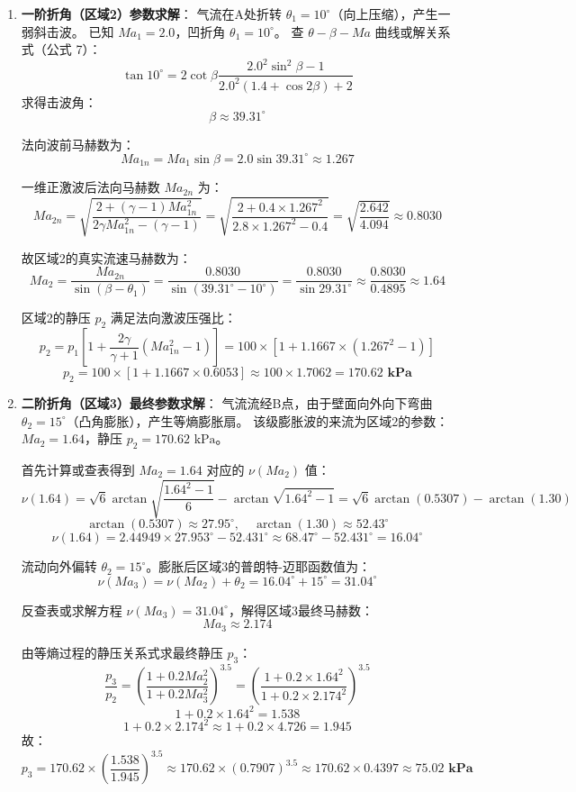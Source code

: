 \documentclass[11pt,a4paper]{ctexart}
\begin{document}
\begin{enumerate}
    \item \textbf{一阶折角（区域2）参数求解}：
    气流在A处折转 $\theta_1 = 10^\circ$（向上压缩），产生一弱斜击波。
    已知 $Ma_1 = 2.0$，凹折角 $\theta_1 = 10^\circ$。
    查 $\theta-\beta-Ma$ 曲线或解关系式（公式 7）：
    \[
    \tan 10^\circ = 2 \cot \beta \frac{2.0^2 \sin^2 \beta - 1}{2.0^2 (1.4 + \cos 2\beta) + 2}
    \]
    求得击波角：
    \[
    \beta \approx 39.31^\circ
    \]
    
    法向波前马赫数为：
    \[
    Ma_{1n} = Ma_1 \sin \beta = 2.0 \sin 39.31^\circ \approx 1.267
    \]
    
    一维正激波后法向马赫数 $Ma_{2n}$ 为：
    \[
    Ma_{2n} = \sqrt{\frac{2 + (\gamma - 1)Ma_{1n}^2}{2\gamma Ma_{1n}^2 - (\gamma - 1)}} = \sqrt{\frac{2 + 0.4 \times 1.267^2}{2.8 \times 1.267^2 - 0.4}} = \sqrt{\frac{2.642}{4.094}} \approx 0.8030
    \]
    
    故区域2的真实流速马赫数为：
    \[
    Ma_2 = \frac{Ma_{2n}}{\sin(\beta - \theta_1)} = \frac{0.8030}{\sin(39.31^\circ - 10^\circ)} = \frac{0.8030}{\sin 29.31^\circ} \approx \frac{0.8030}{0.4895} \approx \mathbf{1.64}
    \]
    
    区域2的静压 $p_2$ 满足法向激波压强比：
    \[
    p_2 = p_1 \left[ 1 + \frac{2\gamma}{\gamma+1}(Ma_{1n}^2 - 1) \right] = 100 \times \left[ 1 + 1.1667 \times (1.267^2 - 1) \right]
    \]
    \[
    p_2 = 100 \times \left[ 1 + 1.1667 \times 0.6053 \right] \approx 100 \times 1.7062 = \mathbf{170.62\text{ kPa}}
    \]

    \item \textbf{二阶折角（区域3）最终参数求解}：
    气流流经B点，由于壁面向外向下弯曲 $\theta_2 = 15^\circ$（凸角膨胀），产生等熵膨胀扇。
    该级膨胀波的来流为区域2的参数：$Ma_2 = 1.64$，静压 $p_2 = 170.62\text{ kPa}$。
    
    首先计算或查表得到 $Ma_2 = 1.64$ 对应的 $\nu(Ma_2)$ 值：
    \[
    \nu(1.64) = \sqrt{6} \arctan \sqrt{\frac{1.64^2 - 1}{6}} - \arctan \sqrt{1.64^2 - 1} = \sqrt{6} \arctan(0.5307) - \arctan(1.30)
    \]
    \[
    \arctan(0.5307) \approx 27.95^\circ, \quad \arctan(1.30) \approx 52.43^\circ
    \]
    \[
    \nu(1.64) = 2.44949 \times 27.953^\circ - 52.431^\circ \approx 68.47^\circ - 52.431^\circ = 16.04^\circ
    \]
    
    流动向外偏转 $\theta_2 = 15^\circ$。膨胀后区域3的普朗特-迈耶函数值为：
    \[
    \nu(Ma_3) = \nu(Ma_2) + \theta_2 = 16.04^\circ + 15^\circ = 31.04^\circ
    \]
    
    反查表或求解方程 $\nu(Ma_3) = 31.04^\circ$，解得区域3最终马赫数：
    \[
    Ma_3 \approx 2.174
    \]
    
    由等熵过程的静压关系式求最终静压 $p_3$：
    \[
    \frac{p_3}{p_2} = \left( \frac{1 + 0.2 Ma_2^2}{1 + 0.2 Ma_3^2} \right)^{3.5} = \left( \frac{1 + 0.2 \times 1.64^2}{1 + 0.2 \times 2.174^2} \right)^{3.5}
    \]
    \[
    1 + 0.2 \times 1.64^2 = 1.538
    \]
    \[
    1 + 0.2 \times 2.174^2 \approx 1 + 0.2 \times 4.726 = 1.945
    \]
    故：
    \[
    p_3 = 170.62 \times \left( \frac{1.538}{1.945} \right)^{3.5} \approx 170.62 \times (0.7907)^{3.5} \approx 170.62 \times 0.4397 \approx \mathbf{75.02\text{ kPa}}
    \]
\end{enumerate}
\end{document}
